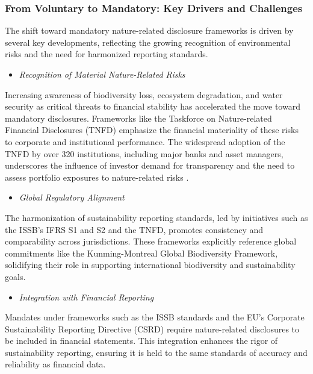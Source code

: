 \documentclass[
  authoryear]{elsarticle}
\providecommand{\tightlist}{%
  \setlength{\itemsep}{0pt}\setlength{\parskip}{0pt}}\usepackage{longtable,booktabs,array}
\begin{document}
\begin{table}
{}

\end{table}%

\subsubsection{From Voluntary to Mandatory: Key Drivers and
Challenges}\label{from-voluntary-to-mandatory-key-drivers-and-challenges}

The shift toward mandatory nature-related disclosure frameworks is
driven by several key developments, reflecting the growing recognition
of environmental risks and the need for harmonized reporting standards.

\begin{itemize}
\tightlist
\item
  \emph{Recognition of Material Nature-Related Risks}
\end{itemize}

Increasing awareness of biodiversity loss, ecosystem degradation, and
water security as critical threats to financial stability has
accelerated the move toward mandatory disclosures. Frameworks like the
Taskforce on Nature-related Financial Disclosures (TNFD) emphasize the
financial materiality of these risks to corporate and institutional
performance. The widespread adoption of the TNFD by over 320
institutions, including major banks and asset managers, underscores the
influence of investor demand for transparency and the need to assess
portfolio exposures to nature-related risks \citep{TNFD2023}.

\begin{itemize}
\tightlist
\item
  \emph{Global Regulatory Alignment}
\end{itemize}

The harmonization of sustainability reporting standards, led by
initiatives such as the ISSB's IFRS S1 and S2 and the TNFD, promotes
consistency and comparability across jurisdictions. These frameworks
explicitly reference global commitments like the Kunming-Montreal Global
Biodiversity Framework, solidifying their role in supporting
international biodiversity and sustainability goals.

\begin{itemize}
\tightlist
\item
  \emph{Integration with Financial Reporting}
\end{itemize}

Mandates under frameworks such as the ISSB standards \citep{IFRS2023S1}
and the EU's Corporate Sustainability Reporting Directive (CSRD) require
nature-related disclosures to be included in financial statements. This
integration enhances the rigor of sustainability reporting, ensuring it
is held to the same standards of accuracy and reliability as financial
data.
\end{document}
